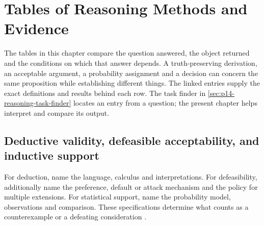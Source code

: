 \chapter{Tables of Reasoning Methods and Evidence}
\label{sec:p14-reasoning-methods-and-evidence}

The tables in this chapter compare the question answered, the object
returned and the conditions on which that answer depends. A truth-preserving
derivation, an acceptable argument, a probability assignment and a decision
can concern the same proposition while establishing different things.
The linked entries supply the exact definitions and results behind each row.
The task finder in \cref{sec:p14-reasoning-task-finder} locates an entry from
a question; the present chapter helps interpret and compare its output.

\section{Deductive validity, defeasible acceptability, and inductive support}
\label{sec:p14-evidence-support}

For deduction, name the language, calculus and interpretations. For
defeasibility, additionally name the preference, default or attack mechanism
and the policy for multiple extensions. For statistical support, name the
probability model, observations and comparison. These specifications determine
what counts as a counterexample or a defeating consideration
\cite{Enderton2001,KrausLehmannMagidor1990,Dung1995}.

